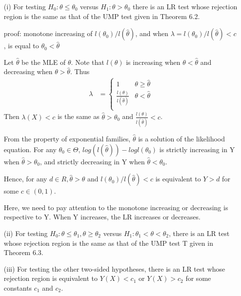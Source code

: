 \documentclass[11pt]{article} %
\begin{document}
\begin{itemize}
	\item [(i)]  For testing $H_0: \theta \leq \theta_0 $ versus $H_1: \theta > \theta_0 $  there is an LR test whose rejection region is the same as that of the UMP test given in
Theorem 6.2.
	
	proof: monotone increasing of $l(\theta_0)/l(\hat{\theta})$, and when $\lambda = l(\theta_0)/l(\hat{\theta}) < c$, is equal to $\theta_0 < \hat{\theta}$
	
	Let $\hat{\theta}$ be the MLE of $\theta$. 
	Note that $l{(\theta)}$ is increasing when $\theta < \hat{\theta}$ and decreasing when $\theta > \hat{\theta}$. Thus
\begin{align*}
	\lambda &= \begin{cases}
	 1 & \theta \geq \hat{\theta} \\
	 \frac{l(\theta)}{l(\hat{\theta})} & \theta < \hat{\theta} \\
	\end{cases}
\end{align*}
Then $\lambda(X) < c$ is the same as $ \hat{\theta} > \theta_0$ and $\frac{l(\theta)}{l(\hat{\theta})} < c$.

From the property of exponential families, $ \hat{\theta} $ is a solution of the likelihood equation. For any $\theta_0 \in \Theta$, $log(l(\hat{\theta})) - log l(\theta_0)$ is strictly increasing in Y when $\hat{\theta} > \theta_0$, and strictly decreasing in Y when $\hat{\theta} < \theta_0$. 

Hence, for any $d \in R, \hat{\theta} > \theta$  and $l(\theta_0)/l(\hat{\theta}) < c$ is equivalent to $Y > d$ for some $c \in (0,1)$.

Here, we need to pay attention to the monotone increasing or decreasing is respective to Y. When Y increases, the LR increases or decreases.


	\item[(ii)]  For testing $H_0: \theta \leq \theta_1,  \theta \geq \theta_2$ versus $H_1: \theta_1 < \theta < \theta_2 $, there is an LR test whose rejection region is the same as that of the UMP test T given in Theorem 6.3.
	
	\item[(iii)] For testing the other two-sided hypotheses, there is an LR test whose rejection region is equivalent to $Y(X) < c_1$ or $Y(X) > c_2 $ for some constants $c_1$ and $c_2$.
	

\end{itemize}
\end{document}
